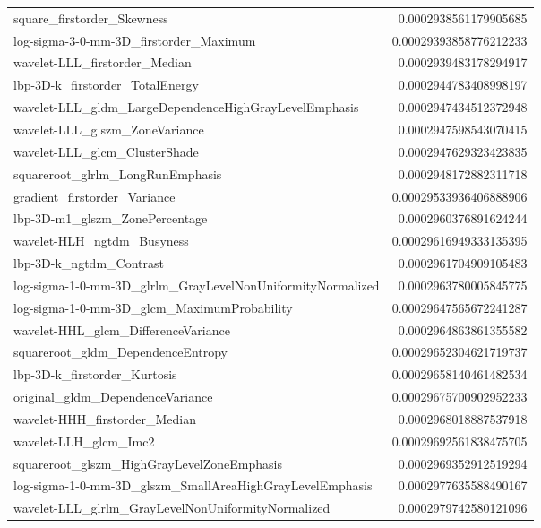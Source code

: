 {\begin{xltabular}[H]{\textwidth}{X r}
        square\_firstorder\_Skewness & 0.0002938561179905685 \\
        log-sigma-3-0-mm-3D\_firstorder\_Maximum & 0.00029393858776212233 \\
        wavelet-LLL\_firstorder\_Median & 0.0002939483178294917 \\
        lbp-3D-k\_firstorder\_TotalEnergy & 0.0002944783408998197 \\
        wavelet-LLL\_gldm\_LargeDependenceHighGrayLevelEmphasis & 0.0002947434512372948 \\
        wavelet-LLL\_glszm\_ZoneVariance & 0.0002947598543070415 \\
        wavelet-LLL\_glcm\_ClusterShade & 0.0002947629323423835 \\
        squareroot\_glrlm\_LongRunEmphasis & 0.0002948172882311718 \\
        gradient\_firstorder\_Variance & 0.00029533936406888906 \\
        lbp-3D-m1\_glszm\_ZonePercentage & 0.0002960376891624244 \\
        wavelet-HLH\_ngtdm\_Busyness & 0.00029616949333135395 \\
        lbp-3D-k\_ngtdm\_Contrast & 0.0002961704909105483 \\
        log-sigma-1-0-mm-3D\_glrlm\_GrayLevelNonUniformityNormalized & 0.0002963780005845775 \\
        log-sigma-1-0-mm-3D\_glcm\_MaximumProbability & 0.00029647565672241287 \\
        wavelet-HHL\_glcm\_DifferenceVariance & 0.0002964863861355582 \\
        squareroot\_gldm\_DependenceEntropy & 0.00029652304621719737 \\
        lbp-3D-k\_firstorder\_Kurtosis & 0.00029658140461482534 \\
        original\_gldm\_DependenceVariance & 0.00029675700902952233 \\
        wavelet-HHH\_firstorder\_Median & 0.0002968018887537918 \\
        wavelet-LLH\_glcm\_Imc2 & 0.00029692561838475705 \\
        squareroot\_glszm\_HighGrayLevelZoneEmphasis & 0.0002969352912519294 \\
        log-sigma-1-0-mm-3D\_glszm\_SmallAreaHighGrayLevelEmphasis & 0.0002977635588490167 \\
        wavelet-LLL\_glrlm\_GrayLevelNonUniformityNormalized & 0.0002979742580121096 \\

\end{xltabular}}
